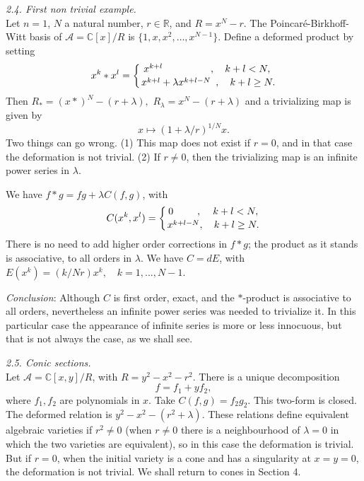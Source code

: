 \documentclass[a4paper,a4paper]{article}
\begin{document}
\smallskip

\noindent\textit{2.4. First non trivial example.} \\
Let $n=1$, $N$ a natural number, $r\in \mathbb{R}$, and $R =  x^N-r$.  
The Poincar\'e-Birkhoff-Witt basis of ${\mathcal{A}} = \mathbb{C} [x]/R$ is 
$\{1,x,x^2,\ldots, x^{N-1}\}$. Define a deformed product by setting
$$
x^k*x^l = \biggl\{{\hskip-0.1cm x^{k+l}  \hskip17mm , 
\,\,\,\,\,\,k+l <N,\atop
x^{k+l}+\lambda x^{k+l-N} \,\,\, , \,\,\,\,\,\, k+l \geq N.}
$$
Then $R_* = (x*)^N -(r+ \lambda), \,\,R_\lambda = x^N-(r+\lambda)$
and a trivializing map is given by 
$$
x \mapsto (1+\lambda/r)^{1/N}x.
$$
Two things can go wrong. (1) This map does not exist if $r = 0$, and in
that case the deformation is not trivial.  (2)  If $r \neq 0$, then the
trivializing map is an infinite power series in $\lambda$.  
 
We have $f*g = fg + \lambda C(f,g)$, with
 $$
C(x^k,x^l) =  \biggl\{ {0 \hskip8.5mm,\hskip4mm k+l < N,\atop
  x^{k+l-N} , \quad k+l \geq N.}
$$
There is no need to add higher order corrections in $f*g$; the product
as it stands is associative,  to all orders in $\lambda$.  We have $C = dE$,
with $E(x^k) = (k/Nr)x^k,\quad k = 1,..., N-1$.
\vspace*{1mm}

\noindent\textit{Conclusion}: Although $C$ is  first order, exact,  
and the $*$-product is associative to all orders, nevertheless an
infinite power series was needed to trivialize it.  
In this particular case the appearance of infinite series is more or 
less innocuous, but that is not always the case, as we shall see.  
 
\smallskip

\noindent\textit{2.5. Conic sections.} \\
Let ${\mathcal{A}} = \mathbb{C}[x,y]/R$, with $R = y^2-x^2 - r^2$. 
There is a unique decomposition 
$$f = f_1 + yf_2,$$
where $f_1,f_2$ are polynomials in $x$. Take $C(f,g) = f_2g_2$. This 
two-form is closed. The deformed relation is $ y^2 -x^2 -( r^2 + \lambda)$. 
These relations define equivalent algebraic varieties if $r^2 \neq 0$
(when $r\neq 0$ there is a neighbourhood of $\lambda =0$ 
in which the two varieties are equivalent), 
so in this case the deformation is trivial. But if $r = 0$, when the 
initial variety is a cone and has a singularity at
$ x = y = 0$, the deformation is not trivial. 
We shall return to cones in Section 4.
\end{document}
